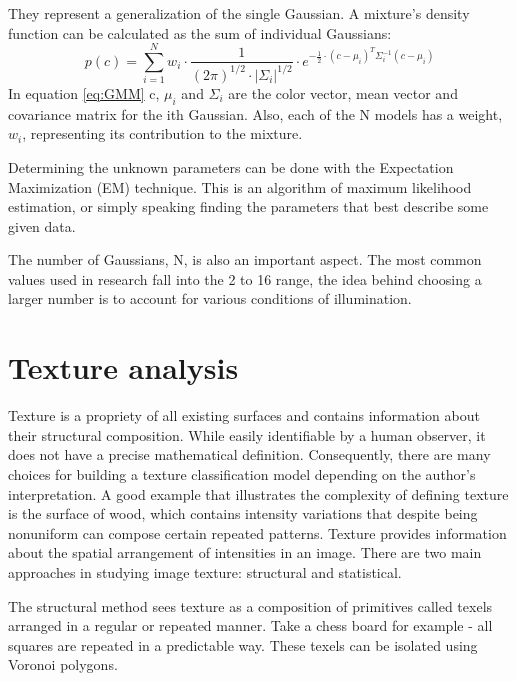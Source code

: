 \documentclass[12pt]{report}
\begin{document}
	They represent a generalization of the single Gaussian. A mixture's density function can be calculated as the sum of individual Gaussians\cite{survey_skin_color_modeling}:
	\begin{equation} \label{eq:GMM}
	p(c) = \sum_{i=1}^{N}w_i \cdot \frac{1}{(2\pi)^{1/2} \cdot |\Sigma_i|^{1/2}} \cdot e^{-\frac{1}{2} \cdot (c - \mu_i)^T\Sigma_i^{-1}(c - \mu_i)}
	\end{equation}
	In equation \ref{eq:GMM} c, \(\mu_i\) and \(\Sigma_i\) are the color vector, mean vector and covariance matrix for the ith Gaussian. Also, each of the N models has a weight, \(w_i\), representing its contribution to the mixture. 
	
	Determining the unknown parameters can be done with the Expectation Maximization (EM) technique\cite{Yang99gaussianmixture}. This is an algorithm of maximum likelihood estimation, or simply speaking finding the parameters that best describe some given data.
	
	The number of Gaussians, N, is also an important aspect. The most common values used in research fall into the 2 to 16 range\cite{survey_skin_color_modeling}, the idea behind choosing a larger number is to account for various conditions of illumination.
	
	\section{Texture analysis}
	
	Texture is a propriety of all existing surfaces and contains information about their structural composition. While easily identifiable by a human observer, it does not have a precise mathematical definition\cite{computer_vision_book}. Consequently, there are many choices for building a texture classification model depending on the author’s interpretation. A good example that illustrates the complexity of defining texture is the surface of wood, which contains intensity variations that despite being nonuniform can compose certain repeated patterns. Texture provides information about the spatial arrangement of intensities in an image\cite{computer_vision_book}. There are two main approaches in studying image texture: structural and statistical. 
	
	The structural method sees texture as a composition of primitives called texels arranged in a regular or repeated manner. Take a chess board for example - all squares are repeated in a predictable way. These texels can be isolated using Voronoi polygons\cite{computer_vision_book}. 
	
\end{document}
